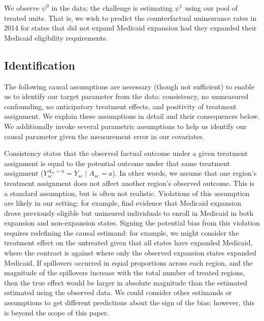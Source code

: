 \documentclass{article}
\begin{document}
We observe $\psi^0$ in the data; the challenge is estimating $\psi^1$ using our pool of treated units. That is, we wish to predict the counterfactual uninsurance rates in 2014 for states that did not expand Medicaid expansion had they expanded their Medicaid eligibility requirements.  

\subsection{Identification}

The following causal assumptions are necessary (though not sufficient) to enable us to identify our target parameter from the data: consistency, no unmeasured confounding, no anticipatory treatment effects, and positivity of treatment assignment. We explain these assumptions in detail and their consequences below. We additionally invoke several parametric assumptions to help us identify our causal parameter given the measurement error in our covariates.

Consistency states that the observed factual outcome under a given treatment assignment is equal to the potential outcome under that same treatment assignment ($Y_{sc}^{A_{sc} = a} = Y_{sc} \mid A_{sc} = a$). In other words, we assume that one region's treatment assignment does not affect another region's observed outcome. This is a standard assumption, but is often not realistic. Violations of this assumption are likely in our setting: for example, \cite{frean2017premium} find evidence that Medicaid expansion drove previously eligible but uninsured individuals to enroll in Medicaid in both expansion and non-expansion states. Signing the potential bias from this violation requires redefining the causal estimand: for example, we might consider the treatment effect on the untreated given that all states have expanded Medicaid, where the contrast is against where only the observed expansion states expanded Medicaid. If spillovers occurred in equal proportions across each region, and the magnitude of the spillovers increase with the total number of treated regions, then the true effect would be larger in absolute magnitude than the estimated estimated using the observed data. We could consider other estimands or assumptions to get different predictions about the sign of the bias; however, this is beyond the scope of this paper.
\end{document}
